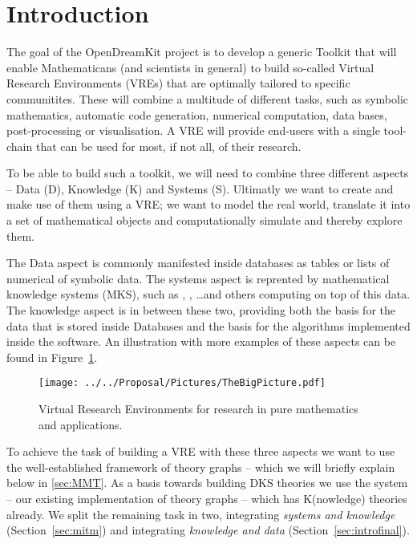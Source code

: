 \section{Introduction}\label{sec:intro}

The goal of the OpenDreamKit project \cite{ODKproposal:on} is to develop a generic Toolkit
that will enable Mathematicans (and scientists in general) to build so-called Virtual
Research Environments (VREs) that are optimally tailored to specific communitites. These
will combine a multitude of different tasks, such as symbolic mathematics, automatic code
generation, numerical computation, data bases, post-processing or visualisation. A VRE
will provide end-users with a single tool-chain that can be used for most, if not all, of
their research.

To be able to build such a toolkit, we will need to combine three different aspects --
Data (D), Knowledge (K) and Systems (S). Ultimatly we want to create and make use of them
using a VRE; we want to model the real world, translate it into a set of mathematical
objects and computationally simulate and thereby explore them.

The Data aspect is commonly manifested inside databases as tables or lists of numerical of
symbolic data. The systems aspect is reprented by mathematical knowledge systems (MKS),
such as \GAP, \SageMath, \dots and others computing on top of this data. The knowledge aspect
is in between these two, providing both the basis for the data that is stored inside
Databases and the basis for the algorithms implemented inside the software. An
illustration with more examples of these aspects can be found in
Figure~\ref{fig:thebigpicture}.

\begin{figure}[H]\centering
  \texttt{[image: ../../Proposal/Pictures/TheBigPicture.pdf]}
  \caption{Virtual Research Environments for research in pure
    mathematics and applications.}
  \label{fig:thebigpicture}
\end{figure}

To achieve the task of building a VRE with these three aspects we want to use the
well-established framework of theory graphs -- which we will briefly explain below in
\ref{sec:MMT}. As a basis towards building DKS theories we use the \MMT system -- our
existing implementation of theory graphs -- which has K(nowledge) theories already. We
split the remaining task in two, integrating \textit{systems and knowledge}
(Section~\ref{sec:mitm}) and integrating \textit{knowledge and data}
(Section~\ref{sec:introfinal}).

